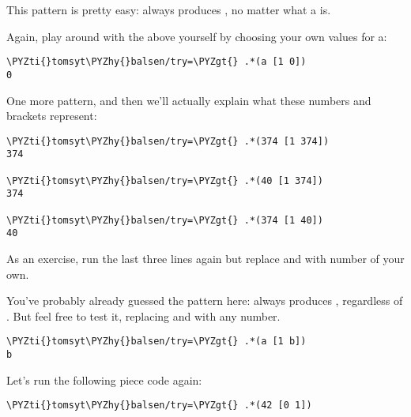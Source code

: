 This pattern is pretty easy:  always produces , no matter what a
is.

Again, play around with the above yourself by choosing your own values for a:

\begin{framed_shaded}
\begin{Verbatim}[fontsize=\relsize{-2.5},fontseries=b,commandchars=\\\{\}]
\PYZti{}tomsyt\PYZhy{}balsen/try=\PYZgt{} .*(a [1 0]) 
0
\end{Verbatim}
\end{framed_shaded}

One more pattern, and then we'll actually explain what these numbers and brackets represent:

\begin{framed_shaded}
\begin{Verbatim}[fontsize=\relsize{-2.5},fontseries=b,commandchars=\\\{\}]
\PYZti{}tomsyt\PYZhy{}balsen/try=\PYZgt{} .*(374 [1 374]) 
374

\PYZti{}tomsyt\PYZhy{}balsen/try=\PYZgt{} .*(40 [1 374]) 
374

\PYZti{}tomsyt\PYZhy{}balsen/try=\PYZgt{} .*(374 [1 40]) 
40
\end{Verbatim}
\end{framed_shaded}

As an exercise, run the last three lines again but replace  and  with
number of your own.

You've probably already guessed the pattern here:  always produces
, regardless of . But feel free to test it, replacing  and  with any number.

\begin{framed_shaded}
\begin{Verbatim}[fontsize=\relsize{-2.5},fontseries=b,commandchars=\\\{\}]
\PYZti{}tomsyt\PYZhy{}balsen/try=\PYZgt{} .*(a [1 b]) 
b
\end{Verbatim}
\end{framed_shaded}

Let's run the following piece code again:

\begin{framed_shaded}
\begin{Verbatim}[fontsize=\relsize{-2.5},fontseries=b,commandchars=\\\{\}]
\PYZti{}tomsyt\PYZhy{}balsen/try=\PYZgt{} .*(42 [0 1])
\end{Verbatim}
\end{framed_shaded}


